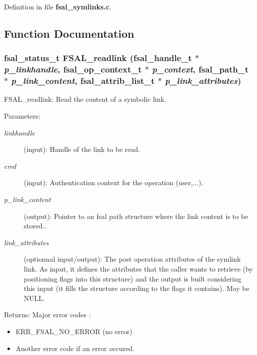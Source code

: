 Definition in file {\bf fsal\_\-symlinks.c}.

\subsection{Function Documentation}
\subsubsection[{FSAL\_\-readlink}]{\setlength{\rightskip}{0pt plus 5cm}fsal\_\-status\_\-t FSAL\_\-readlink (fsal\_\-handle\_\-t $\ast$ {\em p\_\-linkhandle}, \/  fsal\_\-op\_\-context\_\-t $\ast$ {\em p\_\-context}, \/  fsal\_\-path\_\-t $\ast$ {\em p\_\-link\_\-content}, \/  fsal\_\-attrib\_\-list\_\-t $\ast$ {\em p\_\-link\_\-attributes})}\label{fsal__symlinks_8c_c6a33c4a1cf8d89d48ebf73ac49c0b0f}


FSAL\_\-readlink: Read the content of a symbolic link.

\begin{Desc}
\item[Parameters:]
\begin{description}
\item[{\em linkhandle}](input): Handle of the link to be read. \item[{\em cred}](input): Authentication context for the operation (user,...). \item[{\em p\_\-link\_\-content}](output): Pointer to an fsal path structure where the link content is to be stored.. \item[{\em link\_\-attributes}](optionnal input/output): The post operation attributes of the symlink link. As input, it defines the attributes that the caller wants to retrieve (by positioning flags into this structure) and the output is built considering this input (it fills the structure according to the flags it contains). May be NULL.\end{description}
\end{Desc}
\begin{Desc}
\item[Returns:]Major error codes :\begin{itemize}
\item ERR\_\-FSAL\_\-NO\_\-ERROR (no error)\item Another error code if an error occured. \end{itemize}
\end{Desc}


